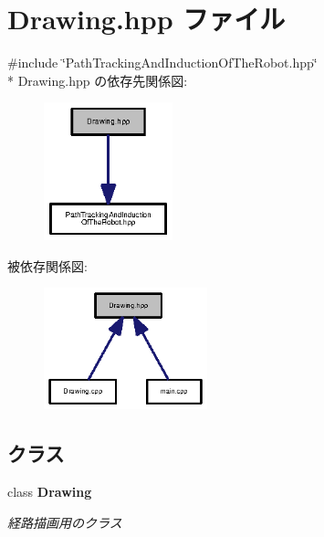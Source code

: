 \section{Drawing.\-hpp ファイル}
\label{_drawing_8hpp}
{\ttfamily \#include \char`\"{}Path\-Tracking\-And\-Induction\-Of\-The\-Robot.\-hpp\char`\"{}}\\*
Drawing.\-hpp の依存先関係図\-:\nopagebreak
\begin{figure}[H]
\begin{center}
\leavevmode
\includegraphics[width=106pt]{_drawing_8hpp__incl}
\end{center}
\end{figure}
被依存関係図\-:\nopagebreak
\begin{figure}[H]
\begin{center}
\leavevmode
\includegraphics[width=134pt]{_drawing_8hpp__dep__incl}
\end{center}
\end{figure}
\subsection*{クラス}
\begin{DoxyCompactItemize}
\item 
class {\bf Drawing}
\begin{DoxyCompactList}\small\item\em 経路描画用のクラス \end{DoxyCompactList}\end{DoxyCompactItemize}
